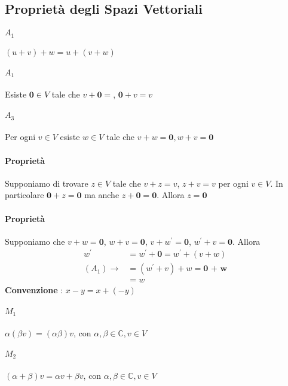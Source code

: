 \documentclass[a4paper, 10pt]{article}
\begin{document}
	\subsection{Proprietà degli Spazi Vettoriali}
	\paragraph*{$A_1$} $ (u + v) + w = u + (v + w)$
	\paragraph*{$A_1$} Esiste $\textbf{0} \in V$ tale che $v + \textbf{0} = $, $\textbf{0} + v = v$
	\paragraph*{$A_3$} Per ogni $v \in V$ esiste $w \in V$ tale che $v + w = \textbf{0}, w + v = \textbf{0}$
	\paragraph*{Proprietà} Supponiamo di trovare $z \in V$ tale che $v + z = v$, $z + v = v$ per ogni $v \in V$. 
						   In particolare $\textbf{0} + z = \textbf{0}$ ma anche $z + \textbf{0} = \textbf{0}$. 
						   Allora $z = \textbf{0}$
	\paragraph*{Proprietà} Supponiamo che $v + w = \textbf{0}$, $w + v = \textbf{0}$, $v + w^{'} = \textbf{0}$, 
						   $w^{'} + v = \textbf{0}$. Allora 
						   \begin{equation*}
						   	\begin{split}
						   		w^{'} &= w^{'} + \textbf{0} = w^{'} + (v + w) \\
						   		(A_1) \rightarrow &= (w^{'} + v) + w = \textbf{0 + w} \\
						   		&= w
						   	\end{split}
						   \end{equation*}						    
	\textbf{Convenzione} : $x - y = x + (-y)$ \\
	\paragraph*{$M_1$} $\alpha (\beta v) = (\alpha \beta) v$, con $\alpha , \beta \in \mathbb{C}, v \in V$
	\paragraph*{$M_2$} $(\alpha + \beta) v = \alpha v + \beta v$, con $\alpha , \beta \in \mathbb{C}, v \in V$
\end{document}

